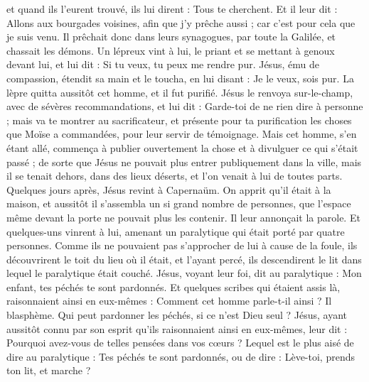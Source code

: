 \begin{multicols}{2}
et quand ils l’eurent trouvé, ils lui dirent : Tous te cherchent.
Et il leur dit : Allons aux bourgades voisines, afin que j'y prêche aussi ; car c’est pour cela que je suis venu.
Il prêchait donc dans leurs synagogues, par toute la Galilée, et chassait les démons.
Un lépreux vint à lui, le priant et se mettant à genoux devant lui, et lui dit : Si tu veux, tu peux me rendre pur.
Jésus, ému de compassion, étendit sa main et le toucha, en lui disant : Je le veux, sois pur.
La lèpre quitta aussitôt cet homme, et il fut purifié.
Jésus le renvoya sur-le-champ, avec de sévères recommandations,
et lui dit : Garde-toi de ne rien dire à personne ; mais va te montrer au sacrificateur, et présente pour ta purification les choses que Moïse a commandées, pour leur servir de témoignage{}.
Mais cet homme, s’en étant allé, commença à publier ouvertement la chose et à divulguer ce qui s'était passé ; de sorte que Jésus ne pouvait plus entrer publiquement dans la ville, mais il se tenait dehors, dans des lieux déserts, et l’on venait à lui de toutes parts.
\VerseOne{}Quelques jours après, Jésus revint à Capernaüm. On apprit qu'il était à la maison,
et aussitôt il s’assembla un si grand nombre de personnes, que l'espace même devant la porte ne pouvait plus les contenir. Il leur annonçait la parole.
Et quelques-uns vinrent à lui, amenant un paralytique qui était porté par quatre personnes.
Comme ils ne pouvaient pas s’approcher de lui à cause de la foule, ils découvrirent le toit du lieu où il était, et l'ayant percé, ils descendirent le lit dans lequel le paralytique était couché.
Jésus, voyant leur foi, dit au paralytique : Mon enfant, tes péchés te sont pardonnés.
Et quelques scribes qui étaient assis là, raisonnaient ainsi en eux-mêmes :
Comment cet homme parle-t-il ainsi ? Il blasphème. Qui peut pardonner les péchés, si ce n’est Dieu seul ?
Jésus, ayant aussitôt connu par son esprit qu'ils raisonnaient ainsi en eux-mêmes, leur dit : Pourquoi avez-vous de telles pensées dans vos cœurs ?
Lequel est le plus aisé de dire au paralytique : Tes péchés te sont pardonnés, ou de dire : Lève-toi, prends ton lit, et marche ?

\end{multicols}
